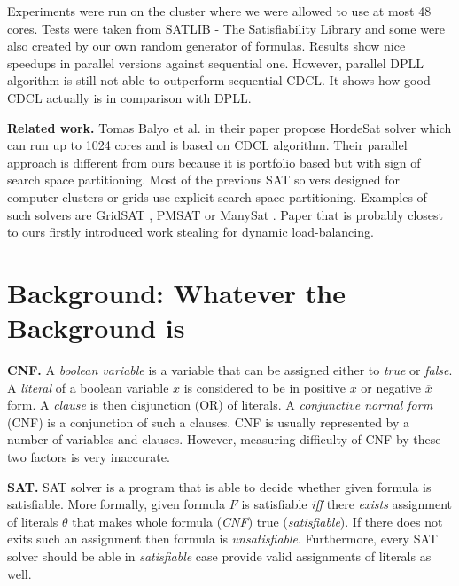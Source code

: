 \documentclass[letterpaper]{article}
\newcommand{\mypar}[1]{{\bf #1.}}
\begin{document}
Experiments were run on the cluster where we were allowed to use at most 48 cores. Tests were taken from SATLIB - The Satisfiability Library \cite{cnf_website} and some were also created by our own random generator of formulas. Results show nice speedups in parallel versions against sequential one. However, parallel DPLL algorithm is still not able to outperform sequential CDCL. It shows how good CDCL actually is in comparison with DPLL. 

\mypar{Related work} Tomas Balyo et al. in their paper \cite{hordesat} propose HordeSat solver which can run up to 1024 cores and is based on CDCL algorithm. Their parallel approach is different from ours because it is portfolio based but with sign of search space partitioning. Most of the previous SAT solvers designed for computer clusters or grids use explicit search space partitioning. Examples of such solvers are GridSAT \cite{gridsat}, PMSAT \cite{pmsat} or ManySat \cite{manysat}. Paper that is probably closest to ours \cite{stealing} firstly introduced work stealing for dynamic load-balancing. 

\section{Background: Whatever the Background is}\label{sec:background}

\mypar{CNF} A \textit{boolean variable} is a variable that can be assigned either to \textit{true} or \textit{false}. A \textit{literal} of a boolean variable $x$ is considered to be in positive $x$ or negative  $\overline{x}$ form. A \textit{clause} is then disjunction (OR) of literals. A \textit{conjunctive normal form} (CNF) is a conjunction of such a clauses. CNF is usually represented by a number of variables and clauses.  However, measuring difficulty of CNF by these two factors is very inaccurate.  

\mypar{SAT} SAT solver is a program that is able to decide whether given formula is satisfiable. More formally, given formula $F$ is satisfiable \textit{iff} there \textit{exists} assignment of literals $\theta$ that makes whole formula (\textit{CNF}) true (\textit{satisfiable}). If there does not exits such an assignment then formula is \textit{unsatisfiable}. Furthermore, every SAT solver should be able in \textit{satisfiable} case provide valid assignments of literals as well. 
\end{document}
